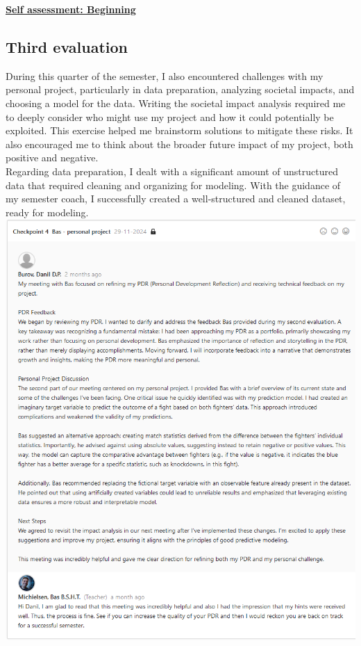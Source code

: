 \documentclass{article}
\begin{document}
	\underline{\textbf{Self assessment: Beginning}}
	
	\subsection{Third evaluation}
	During this quarter of the semester, I also encountered challenges with my personal project, particularly in data preparation, analyzing societal impacts, and choosing a model for the data. Writing the societal impact analysis required me to deeply consider who might use my project and how it could potentially be exploited. This exercise helped me brainstorm solutions to mitigate these risks. It also encouraged me to think about the broader future impact of my project, both positive and negative.\\
	
	Regarding data preparation, I dealt with a significant amount of unstructured data that required cleaning and organizing for modeling. With the guidance of my semester coach, I successfully created a well-structured and cleaned dataset, ready for modeling.\\
	  \includegraphics[width=\textwidth]{images/Feedback_Bas_1.png}\\
	
\end{document}
